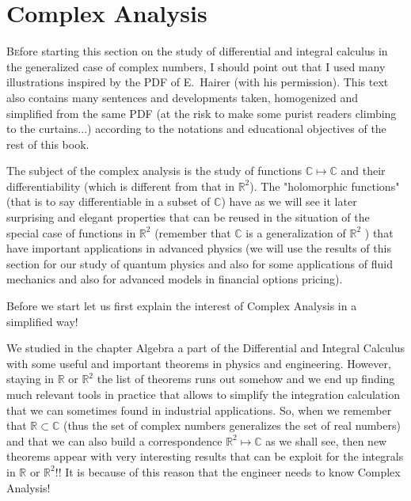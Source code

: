 	\newpage
	\thispagestyle{empty}
	\mbox{}
	\section{Complex Analysis}

\lettrine[lines=4]{\color{BrickRed}B}efore starting this section on the study of differential and integral calculus in the generalized case of complex numbers, I should point out that I used many illustrations inspired by the PDF of E.~Hairer (with his permission). This text also contains many sentences and developments taken, homogenized and simplified from the same PDF (at the risk to make some purist readers climbing to the curtains...) according to the notations and educational objectives of the rest of this book.

The subject of the complex analysis is the study of functions $\mathbb{C} \mapsto \mathbb{C}$ and their differentiability (which is different from that in $\mathbb{R}^2$). The "holomorphic functions" (that is to say differentiable in a subset of $\mathbb{C}$) have as we will see it later surprising and elegant properties that can be reused in the situation of the special case of functions in $\mathbb{R}^2$ (remember that $\mathbb{C}$ is a generalization of $\mathbb{R}^2$ ) that have important applications in advanced physics (we will use the results of this section for our study of quantum physics and also for some applications of fluid mechanics and also for advanced models in financial options pricing).

Before we start let us first explain the interest of Complex Analysis in a simplified way!

We studied in the chapter Algebra a part of the Differential and Integral Calculus with some useful and important theorems in physics and engineering. However, staying in $\mathbb{R}$ or $\mathbb{R}^2$ the list of theorems runs out somehow and we end up finding much relevant tools in practice that allows to simplify the integration calculation that we can sometimes found in industrial applications. So, when we remember that $\mathbb{R} \subset \mathbb{C}$ (thus the set of complex numbers generalizes the set of real numbers) and that we can also build a correspondence $\mathbb{R}^2 \mapsto \mathbb{C}$ as we shall see, then new theorems appear with very interesting results that can be exploit for the integrals in $\mathbb{R}$ or $\mathbb{R}^2$!! It is because of this reason that the engineer needs to know Complex Analysis!

